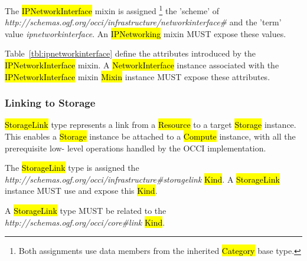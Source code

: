 \documentclass[10pt,a4paper]{article}
\begin{document}
The \hl{IPNetworkInterface} mixin is assigned%
\footnote{Both assignments use data members from the inherited \hl{Category} 
base type.} the 'scheme' of
\textit{http://schemas.ogf.org/occi/infrastructure/networkinterface\#} and the 'term' value 
\textit{ipnetworkinterface}. An \hl{IPNetworking} mixin MUST expose these values.

Table~\ref{tbl:ipnetworkinterface} define the attributes introduced by the
\hl{IPNetworkInterface} mixin.  A \hl{NetworkInterface} instance associated with the
\hl{IPNetworkInterface} mixin \hl{Mixin} instance MUST expose these attributes.


\subsubsection{Linking to Storage}
\hl{StorageLink} type represents a link from a \hl{Resource} to a target \hl{Storage} instance. This 
enables a \hl{Storage} instance be attached to a \hl{Compute} instance, with all the prerequisite low-
level operations handled by the OCCI implementation.

The \hl{StorageLink} type is assigned the  
\textit{http://schemas.ogf.org/occi/infrastructure\#storagelink} \hl{Kind}. A \hl{StorageLink}
instance MUST use and expose this \hl{Kind}. 

A \hl{StorageLink} type MUST be related to the \textit{http://schemas.ogf.org/occi/core\#link} \hl{Kind}.
\end{document}
